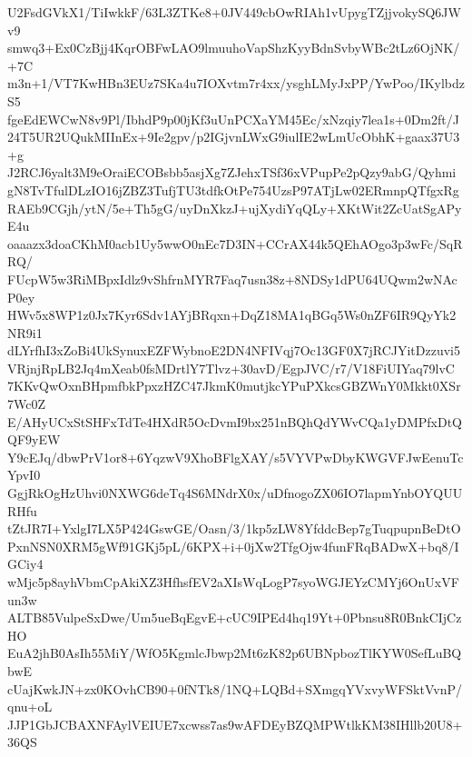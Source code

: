 U2FsdGVkX1/TiIwkkF/63L3ZTKe8+0JV449cbOwRIAh1vUpygTZjjvokySQ6JWv9
smwq3+Ex0CzBjj4KqrOBFwLAO9lmuuhoVapShzKyyBdnSvbyWBc2tLz6OjNK/+7C
m3n+1/VT7KwHBn3EUz7SKa4u7IOXvtm7r4xx/ysghLMyJxPP/YwPoo/IKylbdzS5
fgeEdEWCwN8v9Pl/IbhdP9p00jKf3uUnPCXaYM45Ec/xNzqiy7lea1s+0Dm2ft/J
24T5UR2UQukMIInEx+9Ie2gpv/p2IGjvnLWxG9iulIE2wLmUcObhK+gaax37U3+g
J2RCJ6yalt3M9eOraiECOBsbb5asjXg7ZJehxTSf36xVPupPe2pQzy9abG/Qyhmi
gN8TvTfulDLzIO16jZBZ3TufjTU3tdfkOtPe754UzsP97ATjLw02ERmnpQTfgxRg
RAEb9CGjh/ytN/5e+Th5gG/uyDnXkzJ+ujXydiYqQLy+XKtWit2ZcUatSgAPyE4u
oaaazx3doaCKhM0acb1Uy5wwO0nEc7D3IN+CCrAX44k5QEhAOgo3p3wFc/SqRRQ/
FUcpW5w3RiMBpxIdlz9vShfrnMYR7Faq7usn38z+8NDSy1dPU64UQwm2wNAcP0ey
HWv5x8WP1z0Jx7Kyr6Sdv1AYjBRqxn+DqZ18MA1qBGq5Ws0nZF6IR9QyYk2NR9i1
dLYrfhI3xZoBi4UkSynuxEZFWybnoE2DN4NFIVqj7Oc13GF0X7jRCJYitDzzuvi5
VRjnjRpLB2Jq4mXeab0fsMDrtlY7Tlvz+30avD/EgpJVC/r7/V18FiUIYaq79lvC
7KKvQwOxnBHpmfbkPpxzHZC47JkmK0mutjkcYPuPXkcsGBZWnY0Mkkt0XSr7Wc0Z
E/AHyUCxStSHFxTdTe4HXdR5OcDvmI9bx251nBQhQdYWvCQa1yDMPfxDtQQF9yEW
Y9cEJq/dbwPrV1or8+6YqzwV9XhoBFlgXAY/s5VYVPwDbyKWGVFJwEenuTcYpvI0
GgjRkOgHzUhvi0NXWG6deTq4S6MNdrX0x/uDfnogoZX06IO7lapmYnbOYQUURHfu
tZtJR7I+YxlgI7LX5P424GswGE/Oasn/3/1kp5zLW8YfddcBep7gTuqpupnBeDtO
PxnNSN0XRM5gWf91GKj5pL/6KPX+i+0jXw2TfgOjw4funFRqBADwX+bq8/IGCiy4
wMjc5p8ayhVbmCpAkiXZ3HfhsfEV2aXIsWqLogP7syoWGJEYzCMYj6OnUxVFun3w
ALTB85VulpeSxDwe/Um5ueBqEgvE+cUC9IPEd4hq19Yt+0Pbnsu8R0BnkCIjCzHO
EuA2jhB0AsIh55MiY/WfO5KgmlcJbwp2Mt6zK82p6UBNpbozTlKYW0SefLuBQbwE
cUajKwkJN+zx0KOvhCB90+0fNTk8/1NQ+LQBd+SXmgqYVxvyWFSktVvnP/qnu+oL
JJP1GbJCBAXNFAylVEIUE7xcwss7as9wAFDEyBZQMPWtlkKM38IHllb20U8+36QS
